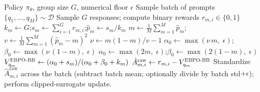 \documentclass{article}
\theoremstyle{plain}
\theoremstyle{definition}
\theoremstyle{remark}
\newcommand{\oursBB}{\textsc{EBPO-BB}\xspace}
\begin{document}
\begin{algorithm}[tb]
     \caption{EBPO Advantage Estimation (Beta-Binomial Variant)}
     \label{alg:EBPO_BB}
  \begin{algorithmic}[1]
      Policy $\pi_\theta$, group size $G$, numerical floor $\epsilon$
         \STATE Sample batch of prompts $\{q_1,\dots,q_M\}\sim\mathcal{D}$
             \STATE Sample $G$ responses; compute binary rewards $r_{m,i}\in\{0,1\}$
             \STATE $k_m \gets G$;\quad $s_m \gets \sum_{i=1}^{G} r_{m,i}$;\quad $\hat p_m \gets s_m / k_m$
         \ENDFOR
         \STATE {}
         \STATE $m \gets \frac{1}{M}\sum_{m=1}^{M}\hat p_m$;\quad $v \gets \frac{1}{M}\sum_{m=1}^{M}(\hat p_m - m)^2$
             \STATE $\nu \gets m(1-m)/v - 1$
             \STATE $\alpha_0 \gets \max(\nu\, m,\;\epsilon)$;\quad $\beta_0 \gets \max(\nu\,(1-m),\;\epsilon)$
         \ELSE
             \STATE {}
             \STATE $\alpha_0 \gets \max(2m,\;\epsilon)$;\quad $\beta_0 \gets \max(2(1-m),\;\epsilon)$
         \ENDIF
             \STATE $V_{q_m}^{\oursBB} \gets (\alpha_0 + s_m) / (\alpha_0 + \beta_0 + k_m)$ 
                 \STATE $\hat{A}_{m,i}^{\text{raw}} \gets r_{m,i} - V_{q_m}^{\oursBB}$
             \ENDFOR
         \ENDFOR
         \STATE Standardize $\hat{A}_{m,i}^{\text{raw}}$ across the batch (subtract batch mean; optionally divide by batch std$+\epsilon$); perform clipped-surrogate update.
     \ENDFOR
  \end{algorithmic}
  \end{algorithm}
\end{document}
